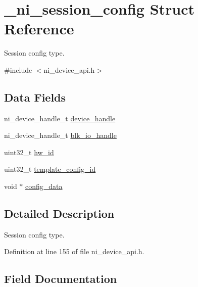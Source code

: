 \hypertarget{struct__ni__session__config}{}\section{\+\_\+ni\+\_\+session\+\_\+config Struct Reference}
\label{struct__ni__session__config}


Session config type.  




{\ttfamily \#include $<$ni\+\_\+device\+\_\+api.\+h$>$}

\subsection*{Data Fields}
\begin{DoxyCompactItemize}
\item 
ni\+\_\+device\+\_\+handle\+\_\+t \mbox{\hyperlink{struct__ni__session__config_a4be6f6176ef1c1f36c9b873e0ac598ee}{device\+\_\+handle}}
\item 
ni\+\_\+device\+\_\+handle\+\_\+t \mbox{\hyperlink{struct__ni__session__config_aa375b9ac96074ffc858e6e9ecfb915bd}{blk\+\_\+io\+\_\+handle}}
\item 
uint32\+\_\+t \mbox{\hyperlink{struct__ni__session__config_a6118a901150ca3895d21bdad25430334}{hw\+\_\+id}}
\item 
uint32\+\_\+t \mbox{\hyperlink{struct__ni__session__config_adc52c8b1e9517e8c5cf2805547fc3182}{template\+\_\+config\+\_\+id}}
\item 
void $\ast$ \mbox{\hyperlink{struct__ni__session__config_a267857a8b9444f2da552625c8d5cd377}{config\+\_\+data}}
\end{DoxyCompactItemize}


\subsection{Detailed Description}
Session config type. 


\begin{DoxyItemize}
\item 
\end{DoxyItemize}

Definition at line 155 of file ni\+\_\+device\+\_\+api.\+h.



\subsection{Field Documentation}
\mbox{\label{struct__ni__session__config_aa375b9ac96074ffc858e6e9ecfb915bd}} 
